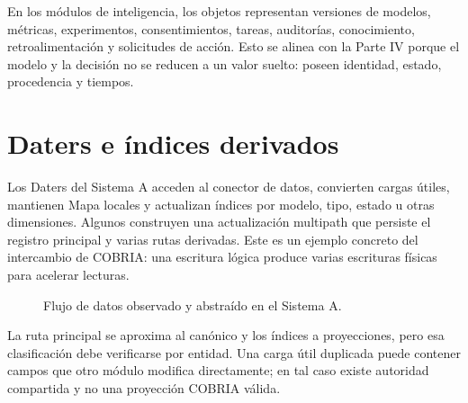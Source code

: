 En los módulos de inteligencia, los objetos representan versiones de modelos, métricas,
experimentos, consentimientos, tareas, auditorías, conocimiento, retroalimentación y solicitudes
de acción. Esto se alinea con la Parte IV porque el modelo y la decisión no se reducen a
un valor suelto: poseen identidad, estado, procedencia y tiempos.

\section{Daters e índices derivados}

Los Daters del Sistema A acceden al conector de datos, convierten cargas útiles, mantienen
Mapa locales y actualizan índices por modelo, tipo, estado u otras dimensiones. Algunos
construyen una actualización multipath que persiste el registro principal y varias rutas
derivadas. Este es un ejemplo concreto del intercambio de COBRIA: una escritura lógica
produce varias escrituras físicas para acelerar lecturas.

\begin{figure}[H]
\centering
{}
\caption{Flujo de datos observado y abstraído en el Sistema A.}
\label{fig:flujo-sistema-a}
\end{figure}

La ruta principal se aproxima al canónico y los índices a proyecciones, pero esa
clasificación debe verificarse por entidad. Una carga útil duplicada puede contener campos
que otro módulo modifica directamente; en tal caso existe autoridad compartida y no una
proyección COBRIA válida.

